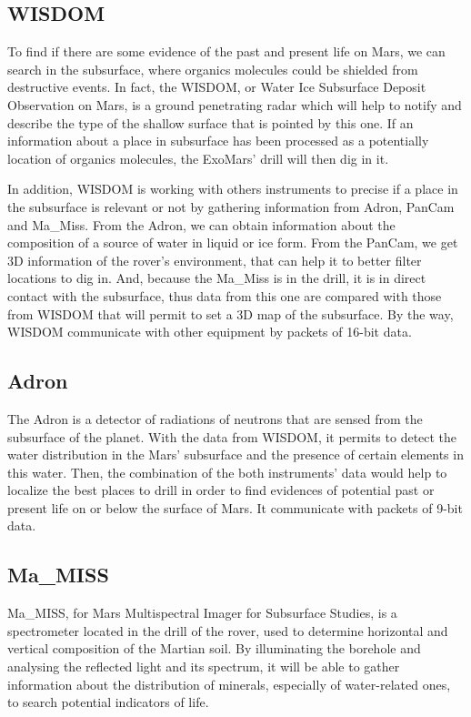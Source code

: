 \documentclass[12pt,a4paper]{article}
\begin{document}
\subsection{WISDOM}

To find if there are some evidence of the past and present life on Mars, we can search in the subsurface, where organics molecules could be shielded from destructive events. In fact, the WISDOM, or Water Ice Subsurface Deposit Observation on Mars, is a ground penetrating radar which will help to notify and describe the type of the shallow surface that is pointed by this one. If an information about a place in subsurface has been processed as a potentially location of organics molecules, the ExoMars' drill will then dig in it.\smallbreak

In addition, WISDOM is working with others instruments to precise if a place in the subsurface is relevant or not by gathering information from Adron, PanCam and Ma\_Miss. From the Adron, we can obtain information about the composition of a source of water in liquid or ice form. From the PanCam, we get 3D information of the rover's environment, that can help it to better filter locations to dig in. And, because the Ma\_Miss is in the drill, it is in direct contact with the subsurface, thus data from this one are compared with those from WISDOM that will permit to set a 3D map of the subsurface. By the way, WISDOM communicate with other equipment by packets of 16-bit data.

\subsection{Adron}

The Adron is a detector of radiations of neutrons that are sensed from the subsurface of the planet. With the data from WISDOM, it permits to detect the water distribution in the Mars' subsurface and the presence of certain elements in this water. Then, the combination of the both instruments' data would help to localize the best places to drill in order to find evidences of potential past or present life on or below the surface of Mars. It communicate with packets of 9-bit data.

\subsection{Ma\_MISS}
Ma\_MISS, for Mars Multispectral Imager for Subsurface Studies, is a spectrometer located in the drill of the rover, used to determine horizontal and vertical composition of the Martian soil. By illuminating the borehole and analysing the reflected light and its spectrum, it will be able to gather information about the distribution of minerals, especially of water-related ones, to search potential indicators of life.
\end{document}
